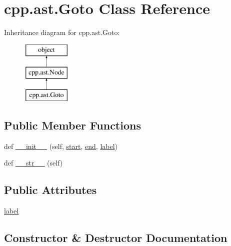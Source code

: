 \hypertarget{classcpp_1_1ast_1_1Goto}{}\section{cpp.\+ast.\+Goto Class Reference}
\label{classcpp_1_1ast_1_1Goto}
Inheritance diagram for cpp.\+ast.\+Goto\+:\begin{figure}[H]
\begin{center}
\leavevmode
\includegraphics[height=3.000000cm]{classcpp_1_1ast_1_1Goto}
\end{center}
\end{figure}
\subsection*{Public Member Functions}
\begin{DoxyCompactItemize}
\item 
def \mbox{\hyperlink{classcpp_1_1ast_1_1Goto_a928e79374a90d01fc060985ea1e45260}{\+\_\+\+\_\+init\+\_\+\+\_\+}} (self, \mbox{\hyperlink{classcpp_1_1ast_1_1Node_a7b2aa97e6a049bb1a93aea48c48f1f44}{start}}, \mbox{\hyperlink{classcpp_1_1ast_1_1Node_a3c5e5246ccf619df28eca02e29d69647}{end}}, \mbox{\hyperlink{classcpp_1_1ast_1_1Goto_a685284ea5f3b21f39aff7f5db841c8f5}{label}})
\item 
def \mbox{\hyperlink{classcpp_1_1ast_1_1Goto_a508b6bc091cf06bfed73a33368c236c9}{\+\_\+\+\_\+str\+\_\+\+\_\+}} (self)
\end{DoxyCompactItemize}
\subsection*{Public Attributes}
\begin{DoxyCompactItemize}
\item 
\mbox{\hyperlink{classcpp_1_1ast_1_1Goto_a685284ea5f3b21f39aff7f5db841c8f5}{label}}
\end{DoxyCompactItemize}


\subsection{Constructor \& Destructor Documentation}
\mbox{\label{classcpp_1_1ast_1_1Goto_a928e79374a90d01fc060985ea1e45260}} 
